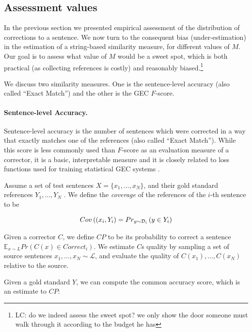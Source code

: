 \documentclass[letter,11pt]{article}
\newcommand{\lc}[1]{\footnote{\color{green}LC: #1}}
\begin{document}
		\subsection{Assessment values} \label{subsec:Assessment-values}
		
		In the previous section we presented empirical assessment of the distribution of
		corrections to a sentence. We now turn to the consequent bias (under-estimation) in the estimation of a string-based similarity measure, for different values of $M$. Our goal is to assess what value of $M$ would be a sweet spot, which is both practical (as collecting references is costly) and reasonably biased.\lc{do we indeed assess the sweet spot? we only show the door someone must walk through it according to the budget he has}
		
		We discuss two similarity measures. One is the sentence-level accuracy (also called ``Exact Match'') and the other is the GEC $F$-score.
		
		\paragraph{Sentence-level Accuracy.}
		Sentence-level accuracy is the number of sentences which were corrected in a way that exactly matches one of the
		references (also called ``Exact Match''). While this score is less commonly used than $F$-score as an evaluation
		measure of a corrector, it is a basic, interpretable measure and it is closely related to loss functions used for
		training statistical GEC systems \cite{rozovskaya2010training,chodorow2012problems,rozovskaya2013joint}. 
		
		Assume a set of test sentences $X=\{x_1,\ldots,x_N\}$,
		and their gold standard references $Y_1,\ldots,Y_N$ . We define the
		{\it coverage} of the references of the $i$-th sentence to be
		
		\begin{equation}
		\footnotesize
		Cov\left((x_i,Y_i\right)=Pr_{y \sim \mathcal{D}_i}\left(y \in Y_i\right)
		\end{equation}
		
		Given a corrector $C$, we define $CP$ to be its probability to correct a sentence $\mathbb{E}_{x\sim{L}}Pr\left(C\left(x\right)\in Correct_i\right)$. We estimate $C$s quality by sampling a set of source sentences
		$x_1,\ldots,x_N \sim \mathcal{L}$, and evaluate the quality of $C(x_1),\ldots,C(x_N)$ relative
		to the source. 
		
		Given a gold standard $Y$, we can compute the common accuracy score, which is an estimate to $CP$:
		
\end{document}
